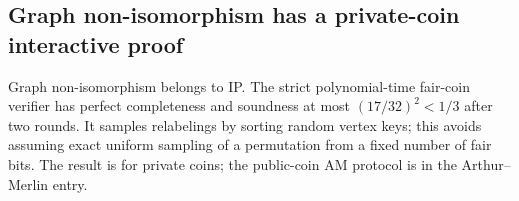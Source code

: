 \begin{result}
\subsection{Graph non-isomorphism has a private-coin interactive proof}
Graph non-isomorphism belongs to IP. The strict polynomial-time fair-coin verifier
has perfect completeness and soundness at most $(17/32)^2<1/3$ after two rounds.
It samples relabelings by sorting random vertex keys; this avoids assuming exact
uniform sampling of a permutation from a fixed number of fair bits. The result is
for private coins; the public-coin AM protocol is in the Arthur--Merlin entry.
\citep{GoldreichMicaliWigderson1991}
\end{result}


